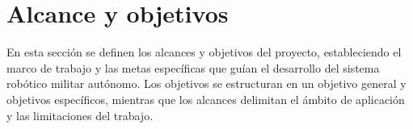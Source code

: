\section{Alcance y objetivos}
\label{Alcance y objetivos}

En esta sección se definen los alcances y objetivos del proyecto, estableciendo el marco de trabajo y las metas específicas que guían el desarrollo del sistema robótico militar autónomo. Los objetivos se estructuran en un objetivo general y objetivos específicos, mientras que los alcances delimitan el ámbito de aplicación y las limitaciones del trabajo.



